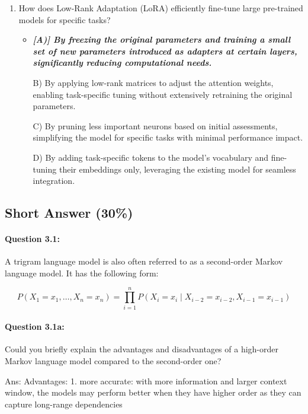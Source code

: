 \documentclass[10pt]{article}
\begin{document}
\begin{enumerate}
\item How does Low-Rank Adaptation (LoRA) efficiently fine-tune large pre-trained models for specific tasks?
    \begin{itemize}
        \item\textbf{\textit{[A)] By freezing the original parameters and training a small set of new parameters introduced as adapters at certain layers, significantly reducing computational needs.}}
        \item[B)] By applying low-rank matrices to adjust the attention weights, enabling task-specific tuning without extensively retraining the original parameters.
        \item[C)] By pruning less important neurons based on initial assessments, simplifying the model for specific tasks with minimal performance impact.
        \item[D)] By adding task-specific tokens to the model’s vocabulary and fine-tuning their embeddings only, leveraging the existing model for seamless integration.
    \end{itemize}



\end{enumerate}

\newpage
\subsection{Short Answer (30\%)}
\paragraph{Question 3.1:} A trigram language model is also often referred to as a second-order Markov language model. It has the following form:

$$
  P\left(X_{1}=x_{1}, \ldots, X_{n}=x_{n}\right)=\prod_{i=1}^{n} P\left(X_{i}=x_{i} \mid X_{i-2}=x_{i-2}, X_{i-1}=x_{i-1}\right)
$$

\paragraph{Question 3.1a:} Could you briefly explain the advantages and disadvantages of a high-order Markov language model compared to the second-order one?

Ans:
    Advantages: 
    1. more accurate: with more information and larger context window, the models may perform better when they have higher order as they can capture long-range dependencies
\end{document}

